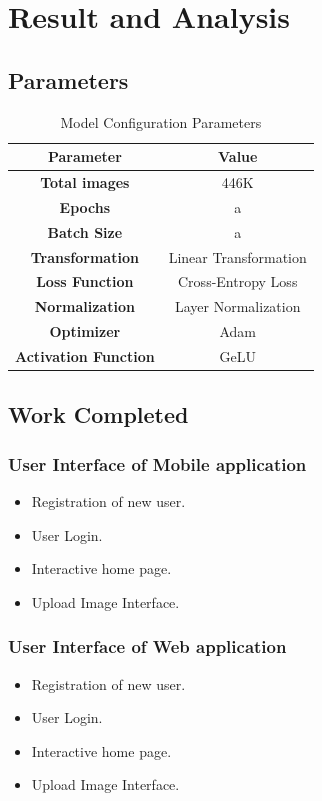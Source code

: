 \section{Result and Analysis}
\subsection*{Parameters}
\begin{table}[h]
    \centering
    \renewcommand{\arraystretch}{1.5} %
    \begin{tabular}{|c|c|}
        \hline
        \textbf{Parameter} & \textbf{Value} \\
        \hline
        \textbf{Total images} & 446K  \\
        \hline
        \textbf{Epochs} &  a\\
        \hline
        \textbf{Batch Size} &  a\\
        \hline
        \textbf{Transformation} & Linear Transformation\\
        \hline
        \textbf{Loss Function} & Cross-Entropy Loss \\
        \hline
        \textbf{Normalization} & Layer Normalization \\
        \hline
        \textbf{Optimizer} & Adam \\
        \hline
        \textbf{Activation Function} & GeLU \\
        \hline
    \end{tabular}
    \caption{Model Configuration Parameters}
    \label{tab:model-parameters}
\end{table}
\subsection{Work Completed}
\subsubsection{User Interface of Mobile application}
\begin{itemize}
    \item Registration of new user.
    \item User Login.
    \item Interactive home page.
    \item Upload Image Interface.
\end{itemize}
\subsubsection{User Interface of Web application}
\begin{itemize}
    \item Registration of new user.
    \item User Login.
    \item Interactive home page.
    \item Upload Image Interface.
\end{itemize}

